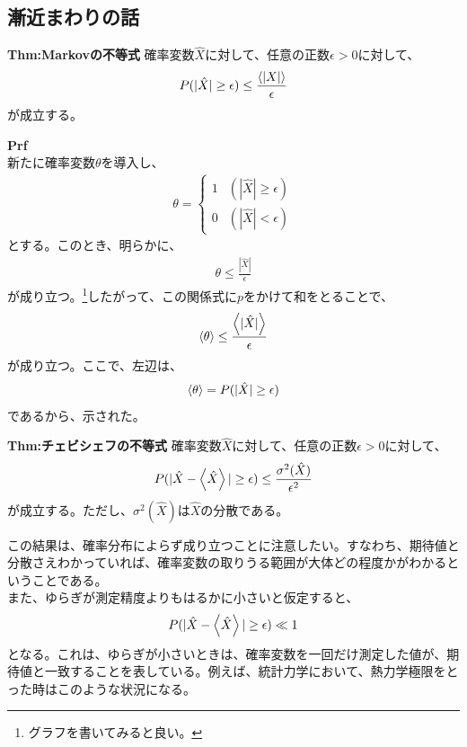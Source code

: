 \documentclass[a4paper,11pt]{jsarticle}
\numberwithin{equation}{section}
\begin{document}
\subsection{漸近まわりの話}
\begin{itembox}[l]{\textbf{Thm:Markovの不等式}}
  確率変数$\hat{X}$に対して、任意の正数$\epsilon > 0$に対して、
  \begin{align}
    P(|\hat{X} | \geq \epsilon) \leq \frac{\expval{|X|}}{\epsilon}
  \end{align}
  が成立する。

\end{itembox}
\textbf{Prf}\\
新たに確率変数$\theta$を導入し、
\begin{align}
  \theta = \begin{cases}
    1 & (|\hat{X}| \geq \epsilon)\\
    0 & (|\hat{X}| < \epsilon)
  \end{cases}
\end{align}
とする。このとき、明らかに、
\begin{align}
  \theta \leq \frac{|\hat{X}|}{\epsilon}
\end{align}
が成り立つ。\footnote{グラフを書いてみると良い。}したがって、この関係式に$p$をかけて和をとることで、
\begin{align}
  \ev{\theta} \leq \frac{\expval{|\hat{X}|}}{\epsilon}
\end{align}
が成り立つ。ここで、左辺は、
\begin{align}
  \ev{\theta} = P(|\hat{X} | \geq \epsilon)
\end{align}
であるから、示された。\hfill\qedsymbol\\


\begin{itembox}[l]{\textbf{Thm:チェビシェフの不等式}}
  確率変数$\hat{X}$に対して、任意の正数$\epsilon > 0$に対して、
  \begin{align}
    P(|\hat{X} - \expval{\hat{X}}| \geq \epsilon) \leq \frac{\sigma^2(\hat{X})}{\epsilon^2}
  \end{align}
  が成立する。ただし、$\sigma^2(\hat{X})$は$\hat{X}$の分散である。

\end{itembox}
この結果は、確率分布によらず成り立つことに注意したい。すなわち、期待値と分散さえわかっていれば、確率変数の取りうる範囲が大体どの程度かがわかるということである。\\
また、ゆらぎが測定精度よりもはるかに小さいと仮定すると、
\begin{align}
  P(|\hat{X} - \expval{\hat{X}}| \geq \epsilon) \ll 1
\end{align}
となる。これは、ゆらぎが小さいときは、確率変数を一回だけ測定した値が、期待値と一致することを表している。例えば、統計力学において、熱力学極限をとった時はこのような状況になる。\\
\end{document}
